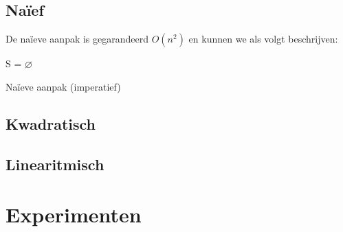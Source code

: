 \documentclass[12pt,a4paper]{article}
\begin{document}
\subsection{Na\"ief}
\label{sec:naief}

De naïeve aanpak is gegarandeerd $O(n^2)$ en kunnen we als volgt beschrijven:

\begin{algorithm}[H]
  S = $\varnothing$\;
 \caption{Na\"ieve aanpak (imperatief)}
\end{algorithm}

\subsection{Kwadratisch}
\label{sec:kwadratisch}

\subsection{Linearitmisch}
\label{sec:linearitmisch}


\section{Experimenten}








\end{document}
